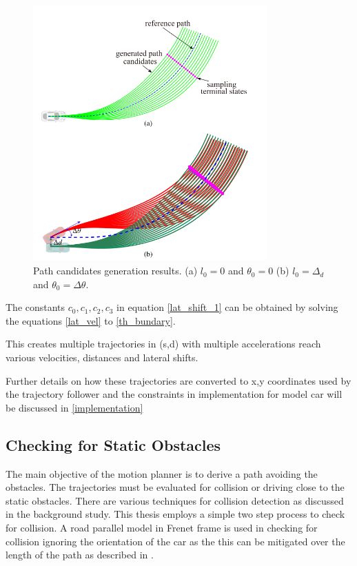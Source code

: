  \begin{figure}[H]
    \centering
    \includegraphics[width=0.8\textwidth]{Images/lateral_planning.png}
    \caption{Path candidates generation results. (a) $l_0 = 0$ and $\theta_0 = 0$ (b) $ 
l_0 = \Delta_d$ and $ \theta_0 = \Delta\theta$.}
    \label{lat_planning}
\end{figure}



The constants $ { c_0,c_1,c_2,c_3}  $ in equation \ref{lat_shift_1} can be obtained by solving the equations \ref{lat_vel} to \ref{th_bundary}.

This creates multiple trajectories in (s,d) with multiple accelerations reach various velocities, distances and lateral shifts. 


Further details on how these trajectories are converted to x,y coordinates used by the trajectory follower and the constraints in implementation for model car will be discussed in \ref{implementation}


\newpage


\subsection{Checking for Static Obstacles} \label{osbtacle_check_satic}
The main objective of the motion planner is to derive a path avoiding the obstacles. The trajectories must be evaluated for collision or driving close to the static obstacles. There are various techniques for collision detection as discussed in the background study. This thesis employs a simple two step process to check for collision. A road parallel model in Frenet frame is used in checking for collision ignoring the orientation of the car as the this can be mitigated over the length of the path as described in \cite{cmu_parallel_thesis}. 


